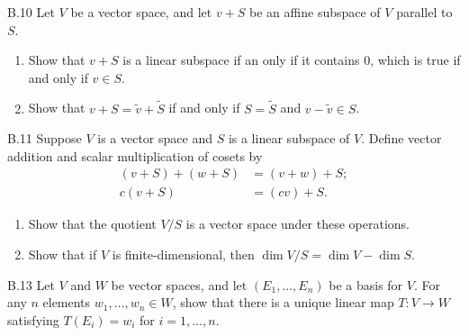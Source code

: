 \begin{exercise}{B.10}
    Let \( V \) be a vector space, and let \( v + S \) be an affine subspace of \( V \) parallel to \( S \).
    \begin{enumerate}[label={(\alph*)}]
        \item Show that \( v + S \) is a linear subspace if an only if it contains \( 0 \), which is true if and only if \( v \in S \).
        \item Show that \( v + S = \widetilde{v} + \widetilde{S} \) if and only if \( S = \widetilde{S} \) and \( v - \widetilde{v} \in S \).
    \end{enumerate}
\end{exercise}

\begin{exercise}{B.11}
    Suppose \( V \) is a vector space and \( S \) is a linear subspace of \( V \). Define vector addition and scalar multiplication of cosets by
    \begingroup
    \allowdisplaybreaks%
    \begin{align*}
        (v + S) + (w + S) & = (v + w) + S; \\
                 c(v + S) & = (cv) + S.
    \end{align*}
    \endgroup
    \begin{enumerate}[label={(\alph*)}]
        \item Show that the quotient \( V/S \) is a vector space under these operations.
        \item Show that if \( V \) is finite-dimensional, then \( \dim V/S = \dim V - \dim S \).
    \end{enumerate}
\end{exercise}

\begin{exercise}{B.13}
    Let \( V \) and \( W \) be vector spaces, and let \( (E_{1}, \dots, E_{n}) \) be a basis for \( V \). For any \( n \) elements \( w_{1}, \dots, w_{n} \in W \), show that there is a unique linear map \( T : V \to W \) satisfying \( T(E_{i}) = w_{i} \) for \( i = 1, \dots, n \).
\end{exercise}

